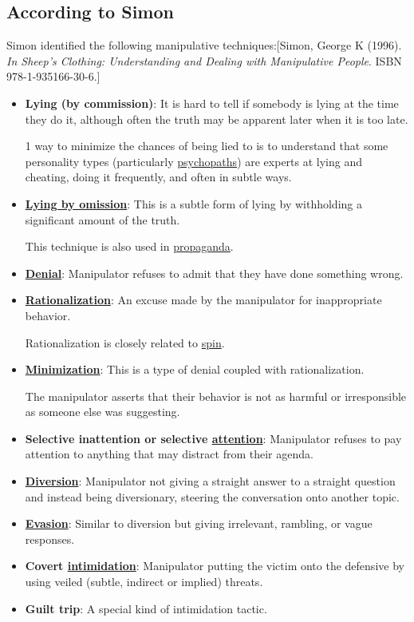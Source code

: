 \documentclass{book}
\numberwithin{equation}{section}
\begin{document}
\subsection{According to Simon}
Simon identified the following manipulative techniques:[Simon, George K (1996). \textit{In Sheep's Clothing: Understanding and Dealing with Manipulative People}. ISBN 978-1-935166-30-6.]
\begin{itemize}
    \item \textbf{Lying (by commission)}: It is hard to tell if somebody is lying at the time they do it, although often the truth may be apparent later when it is too late.
    
    1 way to minimize the chances of being lied to is to understand that some personality types (particularly \href{https://en.wikipedia.org/wiki/Psychopaths}{psychopaths}) are experts at lying and cheating, doing it frequently, and often in subtle ways.
    \item \href{https://en.wikipedia.org/wiki/Lie#Lying_by_omission}{\textbf{Lying by omission}}: This is a subtle form of lying by withholding a significant amount of the truth.
    
    This technique is also used in \href{https://en.wikipedia.org/wiki/Propaganda}{propaganda}.
    \item \href{https://en.wikipedia.org/wiki/Denial}{\textbf{Denial}}: Manipulator refuses to admit that they have done something wrong.
    \item \href{https://en.wikipedia.org/wiki/Rationalization_(psychology)}{\textbf{Rationalization}}: An excuse made by the manipulator for inappropriate behavior.
    
    Rationalization is closely related to \href{https://en.wikipedia.org/wiki/Spin_(public_relations)}{spin}.
    \item \href{https://en.wikipedia.org/wiki/Minimisation_(psychology)}{\textbf{Minimization}}: This is a type of denial coupled with rationalization.
    
    The manipulator asserts that their behavior is not as harmful or irresponsible as someone else was suggesting.
    \item \textbf{Selective inattention or selective \href{https://en.wikipedia.org/wiki/Attention}{attention}}: Manipulator refuses to pay attention to anything that may distract from their agenda.
    \item \href{https://en.wikipedia.org/wiki/Distraction}{\textbf{Diversion}}: Manipulator not giving a straight answer to a straight question and instead being diversionary, steering the conversation onto another topic.
    \item \href{https://en.wikipedia.org/wiki/Evasion_(ethics)}{\textbf{Evasion}}: Similar to diversion but giving irrelevant, rambling, or vague responses.
    \item \textbf{Covert \href{https://en.wikipedia.org/wiki/Intimidation}{intimidation}}: Manipulator putting the victim onto the defensive by using veiled (subtle, indirect or implied) threats.
    \item \textbf{Guilt trip}: A special kind of intimidation tactic.
    

\end{itemize}
\end{document}
